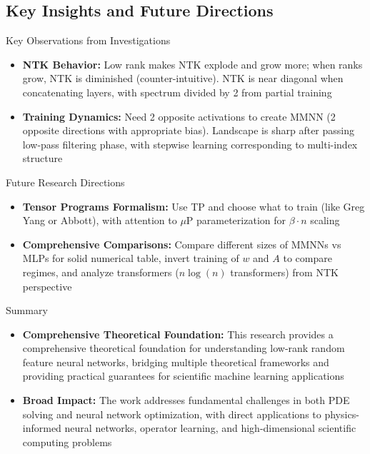 \documentclass[aspectratio=169]{beamer}
\begin{document}
\subsection{Key Insights and Future Directions}

\begin{frame}{Key Observations from Investigations}
\begin{itemize}
\item \textbf{NTK Behavior:} Low rank makes NTK explode and grow more; when ranks grow, NTK is diminished (counter-intuitive). NTK is near diagonal when concatenating layers, with spectrum divided by 2 from partial training
\item \textbf{Training Dynamics:} Need 2 opposite activations to create MMNN (2 opposite directions with appropriate bias). Landscape is sharp after passing low-pass filtering phase, with stepwise learning corresponding to multi-index structure
\end{itemize}
\end{frame}

\begin{frame}{Future Research Directions}
\begin{itemize}
\item \textbf{Tensor Programs Formalism:} Use TP and choose what to train (like Greg Yang or Abbott), with attention to $\mu$P parameterization for $\beta \cdot n$ scaling
\item \textbf{Comprehensive Comparisons:} Compare different sizes of MMNNs vs MLPs for solid numerical table, invert training of $w$ and $A$ to compare regimes, and analyze transformers ($n\log(n)$ transformers) from NTK perspective
\end{itemize}
\end{frame}

\begin{frame}{Summary}
\begin{itemize}
\item \textbf{Comprehensive Theoretical Foundation:} This research provides a comprehensive theoretical foundation for understanding low-rank random feature neural networks, bridging multiple theoretical frameworks and providing practical guarantees for scientific machine learning applications
\item \textbf{Broad Impact:} The work addresses fundamental challenges in both PDE solving and neural network optimization, with direct applications to physics-informed neural networks, operator learning, and high-dimensional scientific computing problems
\end{itemize}
\end{frame}
\end{document}
